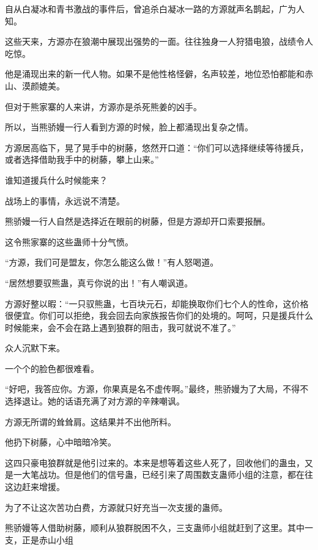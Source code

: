 
\begin{this_body}



自从白凝冰和青书激战的事件后，曾追杀白凝冰一路的方源就声名鹊起，广为人知。

这些天来，方源亦在狼潮中展现出强势的一面。往往独身一人狩猎电狼，战绩令人吃惊。

他是涌现出来的新一代人物。如果不是他性格怪僻，名声较差，地位恐怕都能和赤山、漠颜媲美。

但对于熊家寨的人来讲，方源亦是杀死熊姜的凶手。

所以，当熊骄嫚一行人看到方源的时候，脸上都涌现出复杂之情。

方源居高临下，晃了晃手中的树藤，悠然开口道：“你们可以选择继续等待援兵，或者选择借助我手中的树藤，攀上山来。”

谁知道援兵什么时候能来？

战场上的事情，永远说不清楚。

熊骄嫚一行人自然是选择近在眼前的树藤，但是方源却开口索要报酬。

这令熊家寨的这些蛊师十分气愤。

“方源，我们可是盟友，你怎么能这么做！”有人怒喝道。

“居然想要驭熊蛊，真亏你说的出！”有人嘲讽道。

方源好整以暇：“一只驭熊蛊，七百块元石，却能换取你们七个人的性命，这价格很便宜。你们可以拒绝，我会回去向家族报告你们的处境的。呵呵，只是援兵什么时候能来，会不会在路上遇到狼群的阻击，我可就说不准了。”

众人沉默下来。

一个个的脸色都很难看。

“好吧，我答应你。方源，你果真是名不虚传啊。”最终，熊骄嫚为了大局，不得不选择退让。她的话语充满了对方源的辛辣嘲讽。

方源无所谓的耸耸肩。这结果并不出他所料。

他扔下树藤，心中暗暗冷笑。

这四只豪电狼群就是他引过来的。本来是想等着这些人死了，回收他们的蛊虫，又是一大笔战功。但是他们的信号蛊，已经引来了周围数支蛊师小组的注意，都在往这边赶来增援。

为了不让这次苦功白费，方源就只好充当一次支援的蛊师。

熊骄嫚等人借助树藤，顺利从狼群脱困不久，三支蛊师小组就赶到了这里。其中一支，正是赤山小组


\end{this_body}
